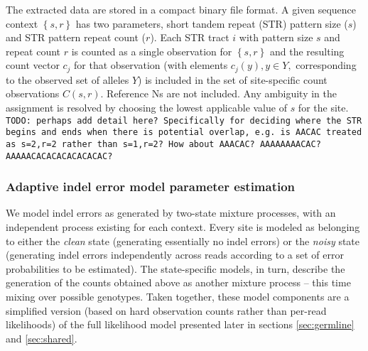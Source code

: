 \documentclass{article}
\begin{document}
The extracted data are stored in a compact binary file format. A given sequence context $\left\{ s,r \right\}$ has two parameters, short tandem repeat (STR) pattern size ($s$) and STR pattern repeat count ($r$). Each STR tract $i$ with pattern size $s$ and repeat count $r$ is counted as a single observation for $\left\{ s,r \right\}$ and the resulting count vector $c_j$ for that observation (with elements $c_j(y), y \in Y,$ corresponding to the observed set of alleles $Y$) is included in the set of site-specific count observations $C(s,r)$. Reference Ns are not included. Any ambiguity in the assignment is resolved by choosing the lowest applicable value of $s$ for the site. {\tt TODO: perhaps add detail here? Specifically for deciding where the STR begins and ends when there is potential overlap, e.g. is AACAC treated as s=2,r=2 rather than s=1,r=2? How about AAACAC? AAAAAAAACAC? AAAAACACACACACACACAC?}

\subsubsection{Adaptive indel error model parameter estimation}
We model indel errors as generated by two-state mixture processes, with an independent process existing for each context. Every site is modeled as belonging to either the \emph{clean} state (generating essentially no indel errors) or the \emph{noisy} state (generating indel errors independently across reads according to a set of error probabilities to be estimated). The state-specific models, in turn, describe the generation of the counts obtained above as another mixture process -- this time mixing over possible genotypes. Taken together, these model components are a simplified version (based on hard observation counts rather than per-read likelihoods) of the full likelihood model presented later in sections \ref{sec:germline} and \ref{sec:shared}.
\end{document}
